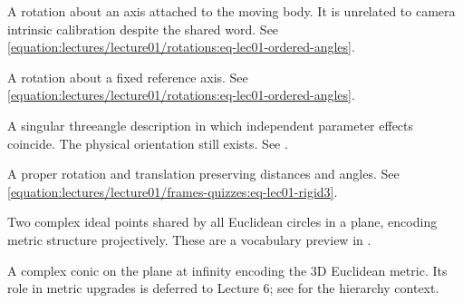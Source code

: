 \documentclass[letterpaper,11pt,english,openany,oneside]{jupyterBook}
\begin{document}
\begin{description}
\sphinxAtStartPar
A rotation about an axis attached to the moving body. It is unrelated to camera intrinsic calibration despite the shared word. See \eqref{equation:lectures/lecture01/rotations:eq-lec01-ordered-angles}.

\sphinxAtStartPar
A rotation about a fixed reference axis. See \eqref{equation:lectures/lecture01/rotations:eq-lec01-ordered-angles}.

\sphinxAtStartPar
A singular three\sphinxhyphen{}angle description in which independent parameter effects coincide. The physical orientation still exists. See {\hyperref[\detokenize{lectures/lecture01/rotations:lec01-rotations}]{}}.

\sphinxAtStartPar
A proper rotation and translation preserving distances and angles. See \eqref{equation:lectures/lecture01/frames-quizzes:eq-lec01-rigid3}.

\sphinxAtStartPar
Two complex ideal points shared by all Euclidean circles in a plane, encoding metric structure projectively. These are a vocabulary preview in {\hyperref[\detokenize{lectures/lecture01/transformations:lec01-transformations}]{}}.

\sphinxAtStartPar
A complex conic on the plane at infinity encoding the 3D Euclidean metric. Its role in metric upgrades is deferred to Lecture 6; see {\hyperref[\detokenize{lectures/lecture01/frames-quizzes:lec01-frames}]{}} for the hierarchy context.


\end{description}
\end{document}
